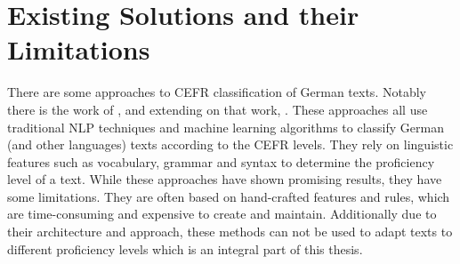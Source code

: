 \section{Existing Solutions and their Limitations}
\label{s:background_existing_solutions}
There are some approaches to CEFR classification of German texts. Notably there is the work of \cite{Szuuegyi2019}, \cite{Vajjala2018} and extending on that work, \cite{Caines2020}. These approaches all use traditional NLP techniques and machine learning algorithms to classify German (and other languages) texts according to the CEFR levels. They rely on linguistic features such as vocabulary, grammar and syntax to determine the proficiency level of a text. While these approaches have shown promising results, they have some limitations. They are often based on hand-crafted features and rules, which are time-consuming and expensive to create and maintain. Additionally due to their architecture and approach, these methods can not be used to adapt texts to different proficiency levels which is an integral part of this thesis.